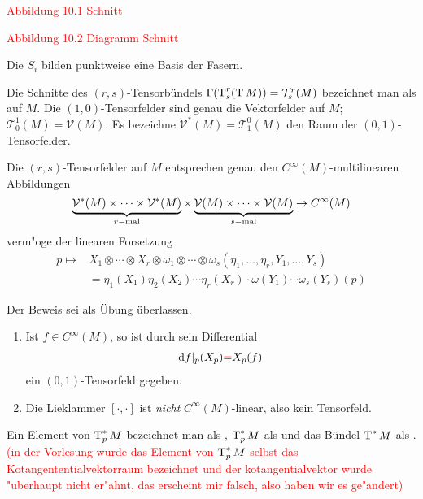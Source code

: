 \textcolor{red}{Abbildung 10.1 Schnitt}

\textcolor{red}{Abbildung 10.2 Diagramm Schnitt}

Die $S_i$ bilden punktweise eine Basis der Fasern.

Die Schnitte des $(r,s)$-Tensorbündels $\Gamma(\operatorname{T}_s^r(\operatorname{T} M)) = \mathcal T_s^r(M)$ bezeichnet man als  auf $M$. Die $(1,0)$-Tensorfelder sind genau die Vektorfelder auf $M$; $\mathcal T_0^1(M) = \mathcal V(M)$. Es bezeichne $\mathcal V^{*}(M) = \mathcal T_1^0(M)$ den Raum der $(0,1)$-Tensorfelder.

\begin{Prop}
Die $(r,s)$-Tensorfelder auf $M$ entsprechen genau den $C^{\infty}(M)$-multilinearen Abbildungen
	\[ \underbrace{\mathcal V^{*}(M) \times \cdots \times \mathcal V^{*}(M)}_{r-\text{mal}} \times \underbrace{\mathcal V(M) \times \cdots \times \mathcal V(M)}_{s-\text{mal}} \to C^{\infty}(M) \]
verm"oge der linearen Forsetzung
\begin{align*}
	p \mapsto & X_1 \otimes \cdots \otimes X_r \otimes \omega_1 \otimes \cdots \otimes \omega_s (\eta_1, \ldots, \eta_r, Y_1, \ldots, Y_s)\\
	& = \eta_1(X_1)\eta_2(X_2)\cdots\eta_r(X_r) \cdot \omega(Y_1)\cdots \omega_s(Y_s) (p)
\end{align*}
\end{Prop}

Der Beweis sei als Übung überlassen.

\begin{bsp}\begin{enumerate}[label=\arabic*)]
\item
	Ist $f \in C^{\infty}(M)$, so ist durch sein Differential
	\begin{align*}
		\mathrm{d} f|_p(X_p) \textcolor{red}{=} X_p(f)
	\end{align*}
	ein $(0,1)$-Tensorfeld gegeben.
\item
	Die Lieklammer $[\cdot,\cdot]$ ist \emph{nicht} $C^{\infty}(M)$-linear, also kein Tensorfeld.
\end{enumerate}\end{bsp}

Ein Element von $\operatorname{T}_p^*M$ bezeichnet man als , $\operatorname{T}_p^*M$ als  und das Bündel $\operatorname{T}^{*}M$ als . \textcolor{red}{(in der Vorlesung wurde das Element von $\operatorname{T}_p^*M$ selbst das Kotangententialvektorraum bezeichnet und der kotangentialvektor wurde "uberhaupt nicht er"ahnt, das erscheint mir falsch, also haben wir es ge"andert)}

